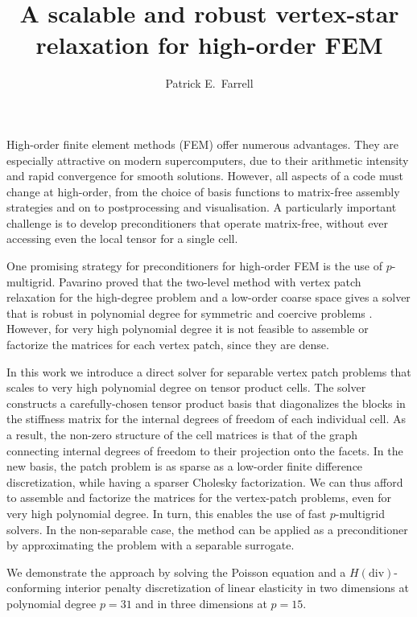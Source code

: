 \documentclass[a4paper]{amsart}
\date{}
\begin{document}
\title{A scalable and robust vertex-star relaxation for high-order FEM}
\author{Patrick E.~Farrell} %
\address{University of Oxford} %

\maketitle

High-order finite element methods (FEM) offer numerous advantages. They are especially attractive on modern supercomputers, due to their arithmetic intensity and rapid convergence for smooth solutions. However, all aspects of a code must change at high-order, from the choice of basis functions to matrix-free assembly strategies and on to postprocessing and visualisation. A particularly important challenge is to develop preconditioners that operate matrix-free, without ever accessing even the local tensor for a single cell.

One promising strategy for preconditioners for high-order FEM is the use of $p$-multigrid.
Pavarino proved that the two-level method with vertex patch relaxation for the high-degree problem and a
low-order coarse space gives a solver that is robust in polynomial degree for symmetric and coercive
problems \cite{pavarino93_farrell}.
However, for very high polynomial degree it is
not feasible to assemble or factorize the matrices for each vertex patch, since they are dense. 

In this work we introduce a direct solver for separable vertex patch problems that scales
to very high polynomial degree on tensor product cells. The solver
constructs a carefully-chosen tensor product basis that diagonalizes the blocks in the
stiffness matrix for the internal degrees of freedom of each individual
cell. As a result, the non-zero structure of the cell matrices is that of
the graph connecting internal degrees of freedom to their projection onto
the facets. In the new basis, the patch problem is as sparse as a low-order
finite difference discretization, while having a sparser Cholesky
factorization.  We can thus afford to assemble and factorize the matrices
for the vertex-patch problems, even for very high polynomial degree. In turn, this enables the use of
fast $p$-multigrid solvers. In the
non-separable case, the method can be applied as a preconditioner by
approximating the problem with a separable surrogate.

We demonstrate the approach by solving the Poisson equation 
and a $H(\mathrm{div})$-conforming interior penalty discretization of 
linear elasticity in two dimensions at polynomial degree $p=31$ and in three dimensions at $p = 15$.
\end{document}
